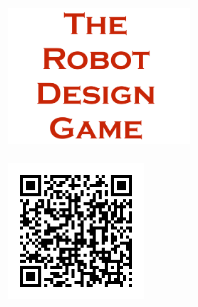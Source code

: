 \documentclass[11pt]{article}
\begin{document}
            
	
	\begin{center}
		\vfill
		\vfill
		\vfill

		\includegraphics[height=3.6cm]{rdg_logo}%
		
		\vfill

		\includegraphics[height=3.6cm]{dedicated_grad_student-qr}%

		\vfill
	\end{center}
\end{document}
